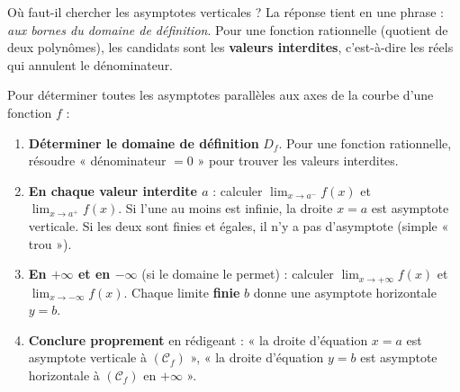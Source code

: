 \documentclass[11pt]{article}
\newcommand{\cle}[1]{{\popxbold\color{popdark}#1}}
\begin{document}
Où faut-il chercher les asymptotes verticales ? La réponse tient en une phrase : \emph{aux bornes du domaine de définition}. Pour une \cle{fonction rationnelle} (quotient de deux polynômes), les candidats sont les \textbf{valeurs interdites}, c'est-à-dire les réels qui annulent le dénominateur.

\begin{methode}
Pour déterminer toutes les asymptotes parallèles aux axes de la courbe d'une fonction $f$ :
\begin{enumerate}
\item \textbf{Déterminer le domaine de définition} $D_f$. Pour une fonction rationnelle, résoudre « dénominateur $= 0$ » pour trouver les valeurs interdites.
\item \textbf{En chaque valeur interdite $a$} : calculer $\lim_{x \to a^-} f(x)$ et $\lim_{x \to a^+} f(x)$. Si l'une au moins est infinie, la droite $x = a$ est asymptote verticale. Si les deux sont finies et égales, il n'y a pas d'asymptote (simple « trou »).
\item \textbf{En $+\infty$ et en $-\infty$} (si le domaine le permet) : calculer $\lim_{x \to +\infty} f(x)$ et $\lim_{x \to -\infty} f(x)$. Chaque limite \textbf{finie} $b$ donne une asymptote horizontale $y = b$.
\item \textbf{Conclure proprement} en rédigeant : « la droite d'équation $x = a$ est asymptote verticale à $(\mathcal{C}_f)$ », « la droite d'équation $y = b$ est asymptote horizontale à $(\mathcal{C}_f)$ en $+\infty$ ».
\end{enumerate}
\end{methode}
\end{document}
